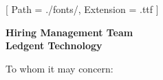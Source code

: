 


\renewcommand{\photo}[2]{}

\geometry{
  left=2cm,
  right=2cm,
  top=2cm,
  bottom=2cm
}



\makecvheader

\setmainfont{NotoSans-Regular}[
  Path = ./fonts/,
  Extension = .ttf
]

\vspace{1cm}
\indent\textbf{Hiring Management Team}\\
\indent\textbf{Ledgent Technology}

\vspace{0.5cm}

\noindent To whom it may concern:

\vspace{0.5cm}

